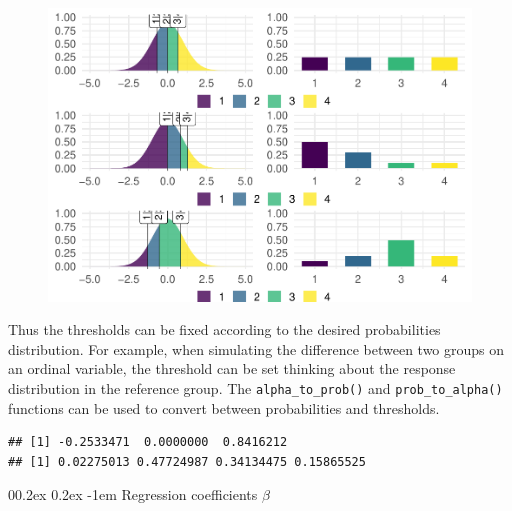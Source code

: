 \documentclass[
  man,floatsintext]{apa6}
\makeatletter
\let\oldparagraph\paragraph
\renewcommand{\paragraph}[1]{\oldparagraph{#1}\mbox{}}
\renewcommand{\paragraph}{\@startsection{paragraph}{4}{\parindent}%
  {0\baselineskip \@plus 0.2ex \@minus 0.2ex}%
  {-1em}%
  {\normalfont\normalsize\bfseries\itshape\typesectitle}}
\makeatother
\begin{document}
\scriptsize

\begin{figure}

{\centering \includegraphics{paper-new_files/figure-latex/fig-show-th-example-1} 

}

\caption{ }\label{fig:fig-show-th-example}
\end{figure}

\normalsize

Thus the thresholds can be fixed according to the desired probabilities distribution. For example, when simulating the difference between two groups on an ordinal variable, the threshold can be set thinking about the response distribution in the reference group. The \texttt{alpha\_to\_prob()} and \texttt{prob\_to\_alpha()} functions can be used to convert between probabilities and thresholds.

\scriptsize

\begin{verbatim}
## [1] -0.2533471  0.0000000  0.8416212
## [1] 0.02275013 0.47724987 0.34134475 0.15865525
\end{verbatim}

\normalsize

\paragraph{\texorpdfstring{Regression coefficients \(\beta\)}{Regression coefficients \textbackslash beta}}\label{regression-coefficients-beta}
\end{document}
